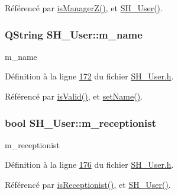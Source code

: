 Référencé par \hyperlink{classSH__User_a763479597c54bb92ad2490826dedacfa}{is\-Manager\-Z()}, et \hyperlink{classSH__User_a96c0ebb3f11c1654935aaecb92295724}{S\-H\-\_\-\-User()}.

\hypertarget{classSH__User_abaf53f509224bdd7f8224259bffea2d6}{
\subsubsection[{m\-\_\-name}]{\setlength{\rightskip}{0pt plus 5cm}Q\-String S\-H\-\_\-\-User\-::m\-\_\-name\hspace{0.3cm}{\ttfamily [private]}}}\label{classSH__User_abaf53f509224bdd7f8224259bffea2d6}


m\-\_\-name 



Définition à la ligne \hyperlink{SH__User_8h_source_l00172}{172} du fichier \hyperlink{SH__User_8h_source}{S\-H\-\_\-\-User.\-h}.



Référencé par \hyperlink{classSH__User_a07de5c02b2a02b3bb2b0aaf0886bb4d9}{is\-Valid()}, et \hyperlink{classSH__User_af5037c555cb6fc44f2968ca2db35635f}{set\-Name()}.

\hypertarget{classSH__User_a86a5f8feb41c4238c5f022e9fbbe2e44}{
\subsubsection[{m\-\_\-receptionist}]{\setlength{\rightskip}{0pt plus 5cm}bool S\-H\-\_\-\-User\-::m\-\_\-receptionist\hspace{0.3cm}{\ttfamily [private]}}}\label{classSH__User_a86a5f8feb41c4238c5f022e9fbbe2e44}


m\-\_\-receptionist 



Définition à la ligne \hyperlink{SH__User_8h_source_l00176}{176} du fichier \hyperlink{SH__User_8h_source}{S\-H\-\_\-\-User.\-h}.



Référencé par \hyperlink{classSH__User_a6e78a5559a202eb3f2bd79e50768da7f}{is\-Receptionist()}, et \hyperlink{classSH__User_a96c0ebb3f11c1654935aaecb92295724}{S\-H\-\_\-\-User()}.



